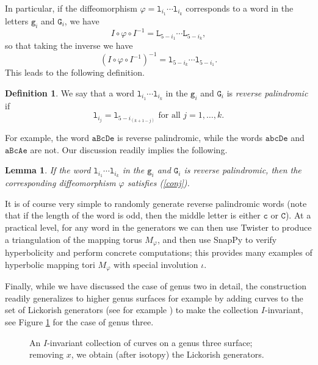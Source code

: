 \documentclass[11pt]{amsart}
\newtheorem{lemma}{Lemma}[section]
\theoremstyle{definition}
\newtheorem{defn}{Definition}[section]
\theoremstyle{remark}
\begin{document}
In particular, if the diffeomorphism $\varphi=\mathtt{l}_{i_1}\cdots \mathtt{l}_{i_k}$ corresponds to a word in the letters $\mathtt{g}_i$ and $\mathtt{G}_i$, we have
\begin{equation*}
I\circ\varphi\circ I^{-1}=\mathtt{L}_{5-i_1}\cdots \mathtt{L}_{5-i_k},
\end{equation*}
so that taking the inverse we have
\begin{equation*}
\left(I\circ\varphi \circ I^{-1}\right)^{-1}=\mathtt{l}_{5-i_k}\cdots \mathtt{l}_{5-i_1}.
\end{equation*}
This leads to the following definition.
\begin{defn}
We say that a word $\mathtt{l}_{i_1}\cdots \mathtt{l}_{i_k}$ in the $\mathtt{g}_i$ and $\mathtt{G}_i$ is \textit{reverse palindromic} if
\begin{equation*}
\mathtt{l}_{i_j}=\mathtt{l}_{5-i_{(k+1-j)}} \text{ for all }j=1,\dots, k.
\end{equation*}
\end{defn}
For example, the word $\mathtt{aBcDe}$ is reverse palindromic, while the words $\mathtt{abcDe}$ and $\mathtt{aBcAe}$ are not. Our discussion readily implies the following.
\begin{lemma}
If the word $\mathtt{l}_{i_1}\cdots \mathtt{l}_{i_k}$ in the $\mathtt{g}_i$ and $\mathtt{G}_i$ is reverse palindromic, then the corresponding diffeomorphism $\varphi$ satisfies (\ref{conj}).
\end{lemma}
It is of course very simple to randomly generate reverse palindromic words (note that if the length of the word is odd, then the middle letter is either $\mathtt{c}$ or $\mathtt{C}$). At a practical level, for any word in the generators we can then use Twister \cite{Twister} to produce a triangulation of the mapping torus $M_\varphi$, and then use SnapPy \cite{SnapPy} to verify hyperbolicity and perform concrete computations; this provides many examples of hyperbolic mapping tori $M_\varphi$ with special involution $\iota$.
\par
Finally, while we have discussed the case of genus two in detail, the construction readily generalizes to higher genus surfaces for example by adding curves to the set of Lickorish generators (see for example \cite[Section 4.4]{FM}) to make the collection $I$-invariant, see Figure \ref{genus3} for the case of genus three.

\begin{figure}
  \centering
\def\svgwidth{0.8\textwidth}

\caption{An $I$-invariant collection of curves on a genus three surface; removing $x$, we obtain (after isotopy) the Lickorish generators.}
\label{genus3}
\end{figure} 
\end{document}
